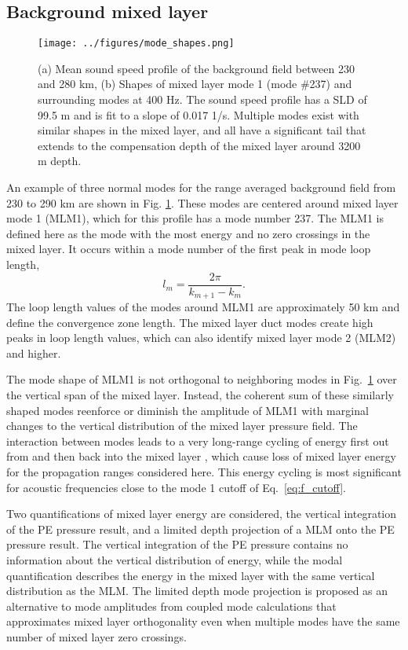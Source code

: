 \documentclass[preprint,NumberedRefs]{JASA}
\begin{document}
\subsection{Background mixed layer}\label{ssec:bg}
\begin{figure}
\texttt{[image: ../figures/mode\_shapes.png]}
    \caption{\label{fig:bg_modes}{(a) Mean sound speed profile of the background field between 230 and 280 km, (b) Shapes of mixed layer mode 1 (mode \#237) and surrounding modes at 400 Hz. The sound speed profile has a SLD of 99.5 m and is fit to a slope of 0.017 1/s. Multiple modes exist with similar shapes in the mixed layer, and all have a significant tail that extends to the compensation depth of the mixed layer around 3200 m depth.}}
\end{figure}
An example of three normal modes for the range averaged background field from 230 to 290 km are shown in Fig. \ref{fig:bg_modes}. These modes are centered around mixed layer mode 1 (MLM1), which for this profile has a mode number 237. The MLM1 is defined here as the mode with the most energy and no zero crossings in the mixed layer. It occurs within a mode number of the first peak in mode loop length\citep{jensen2011computational},
\begin{equation}
    l_{m} = \frac{2 \pi}{k_{m+1} - k_m}.
    \label{eq:loop_length}
\end{equation}
The loop length values of the modes around MLM1 are approximately 50 km and define the convergence zone length. The mixed layer duct modes create high peaks in loop length values, which can also identify mixed layer mode 2 (MLM2) and higher.

The mode shape of MLM1 is not orthogonal to neighboring modes in Fig.~\ref{fig:bg_modes} over the vertical span of the mixed layer. Instead, the coherent sum of these similarly shaped modes reenforce or diminish the amplitude of MLM1 with marginal changes to the vertical distribution of the mixed layer pressure field. The interaction between modes leads to a very long-range cycling of energy first out from and then back into the mixed layer \citep{porter93}, which cause loss of mixed layer energy for the propagation ranges considered here. This energy cycling is most significant for acoustic frequencies close to the mode 1 cutoff of Eq.~\eqref{eq:f_cutoff}.

Two quantifications of mixed layer energy are considered, the vertical integration of the PE pressure result, and a limited depth projection of a MLM onto the PE pressure result. The vertical integration of the PE pressure contains no information about the vertical distribution of energy, while the modal quantification describes the energy in the mixed layer with the same vertical distribution as the MLM. The limited depth mode projection is proposed as an alternative to mode amplitudes from coupled mode calculations that approximates mixed layer orthogonality even when multiple modes have the same number of mixed layer zero crossings.
\end{document}
